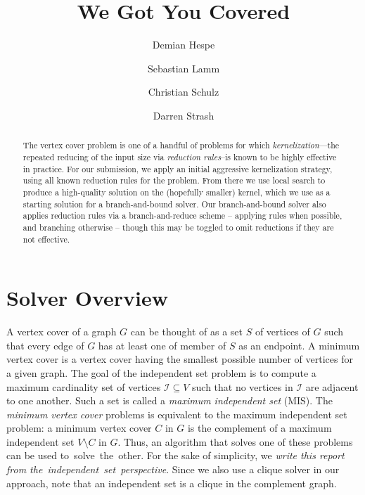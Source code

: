\documentclass[a4paper,UKenglish]{lipics-v2016}
\newcommand{\mytitle}{We Got You Covered}
\begin{document}
\title{\mytitle}
\author[1]{Demian Hespe}
\author[2]{Sebastian Lamm}
\author[3]{Christian Schulz}
\author[4]{Darren Strash}


\date{}


\Copyright{}
\maketitle
\begin{abstract}
The vertex cover problem is one of a handful of problems for which \emph{kernelization}---the repeated reducing of the input size via \emph{reduction rules}--is known to be highly effective in practice. For our submission, we apply an initial aggressive kernelization strategy, using all known reduction rules for the problem. From there we use local search to produce a high-quality solution on the (hopefully smaller) kernel, which we use as a starting solution for a branch-and-bound solver. Our branch-and-bound solver also applies reduction rules via a branch-and-reduce scheme -- applying rules when possible, and branching otherwise -- though this may be toggled to omit reductions if they are not effective.\end{abstract}
\section{Solver Overview}

A vertex cover of a graph $G$ can be thought of as a set $S$ of vertices of $G$ such that every edge of $G$ has at least one of member of $S$ as an endpoint.
A minimum vertex cover is a vertex cover having the smallest possible number of vertices for a given graph. 
The goal of the independent set problem is to compute a maximum cardinality set of vertices $\mathcal{I}\subseteq V$ such that no vertices in $\mathcal{I}$ are adjacent to one another. Such a set is called a \emph{maximum independent set} (MIS).
The \emph{minimum vertex cover} problems is 
equivalent to the maximum independent set problem: a
minimum vertex cover $C$ in $G$ is the complement of a maximum independent set $V\setminus C$ in $G$. Thus, an algorithm that solves one of these problems can be used to~solve~the~other.
For the sake of simplicity, we \emph{write this report from the~independent~set~perspective}. 
Since we also use a clique solver in our approach, note that an independent set is a clique in the complement graph.
\end{document}
